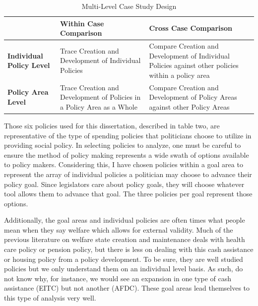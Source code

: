 \documentclass[12pt]{article}
\begin{document}

\begin{table}
\centering
    \begin{tabularx}{\textwidth}{XXX} \toprule
           & \textbf{Within Case Comparison} & \textbf{Cross Case Comparison                                                                              } \\ \midrule
    \textbf{Individual Policy Level} & Trace Creation and Development of Individual Policies        & Compare Creation and Development of Individual Policies against other policies within a policy area \\
    \textbf{Policy Area Level}       & Trace Creation and Development of Policies in a Policy Area as a Whole & Compare Creation and Development of Policy Areas against other Policy Areas                         \\ \bottomrule
    \end{tabularx}
  \caption{Multi-Level Case Study Design}
  \label{tab:casestudy}
\end{table}

Those six policies used for this dissertation, described in table two, are representative of the type of spending policies that politicians choose to utilize in providing social policy. In selecting policies to analyze, one must be careful to ensure the method of policy making represents a wide swath of options available to policy makers. Considering this, I have chosen policies within a goal area to represent the array of individual policies a politician may choose to advance their policy goal. Since legislators care about policy goals, they will choose whatever tool allows them to advance that goal. The three policies per goal represent those options. 

Additionally, the goal areas and individual policies are often times what people mean when they say welfare which allows for external validity. Much of the previous literature on welfare state creation and maintenance deals with health care policy or pension policy, but there is less on dealing with this cash assistance or housing policy from a policy development. To be sure, they are well studied policies but we only understand them on an individual level basis. As such, do not know why, for instance, we would see an expansion in one type of cash assistance (EITC) but not another (AFDC). These goal areas lead themselves to this type of analysis very well.
\end{document}
